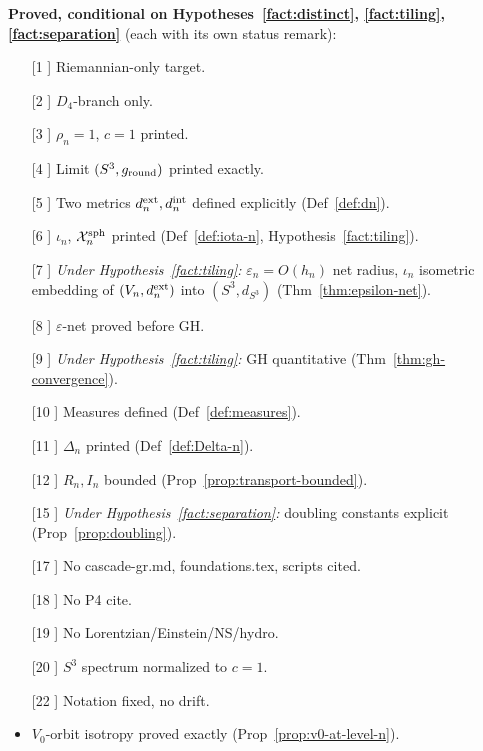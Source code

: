 \documentclass[11pt, a4paper]{amsart}
\theoremstyle{definition}
\newcommand{\dsph}{d_{S^3}}
\begin{document}
\textbf{Proved, conditional on Hypotheses~\ref{fact:distinct},
\ref{fact:tiling}, \ref{fact:separation}} (each with its own
status remark):
\begin{itemize}
\item[[1]] Riemannian-only target.
\item[[2]] $D_4$-branch only.
\item[[3]] $\rho_n = 1$, $c = 1$ printed.
\item[[4]] Limit $(S^3, g_{\rm round})$ printed exactly.
\item[[5]] Two metrics $d_n^{\rm ext}, d_n^{\rm int}$ defined
  explicitly (Def~\ref{def:dn}).
\item[[6]] $\iota_n$, $\mathcal X_n^{\rm sph}$ printed
  (Def~\ref{def:iota-n}, Hypothesis~\ref{fact:tiling}).
\item[[7]] \emph{Under Hypothesis~\ref{fact:tiling}:}
  $\varepsilon_n = O(h_n)$ net radius, $\iota_n$ isometric
  embedding of $(V_n, d_n^{\rm ext})$ into $(S^3, \dsph)$
  (Thm~\ref{thm:epsilon-net}).
\item[[8]] $\varepsilon$-net proved before GH.
\item[[9]] \emph{Under Hypothesis~\ref{fact:tiling}:} GH
  quantitative (Thm~\ref{thm:gh-convergence}).
\item[[10]] Measures defined (Def~\ref{def:measures}).
\item[[11]] $\Delta_n$ printed (Def~\ref{def:Delta-n}).
\item[[12]] $R_n, I_n$ bounded
  (Prop~\ref{prop:transport-bounded}).
\item[[15]] \emph{Under Hypothesis~\ref{fact:separation}:}
  doubling constants explicit (Prop~\ref{prop:doubling}).
\item[[17]] No cascade-gr.md, foundations.tex, scripts cited.
\item[[18]] No P4 cite.
\item[[19]] No Lorentzian/Einstein/NS/hydro.
\item[[20]] $S^3$ spectrum normalized to $c = 1$.
\item[[22]] Notation fixed, no drift.
\item $V_0$-orbit isotropy proved exactly
  (Prop~\ref{prop:v0-at-level-n}).
\end{itemize}
\end{document}
